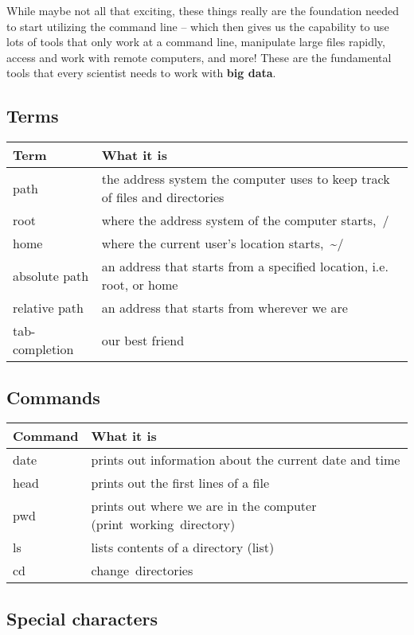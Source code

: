 \documentclass[
]{book}
\begin{document}
While maybe not all that exciting, these things really are the foundation needed to start utilizing the command line -- which then gives us the capability to use lots of tools that only work at a command line, manipulate large files rapidly, access and work with remote computers, and more! These are the fundamental tools that every scientist needs to work with \textbf{big data}.

\hypertarget{terms}{%
\subsection{Terms}\label{terms}}

\begin{longtable}{ll}
\toprule
\textbf{Term} & \textbf{What it is}\\
\midrule
path & the address system the computer uses to keep track of files and directories\\
root & where the address system of the computer starts, /\\
home & where the current user’s location starts, \textasciitilde{}/\\
absolute path & an address that starts from a specified location, i.e. root, or home\\
relative path & an address that starts from wherever we are\\
\addlinespace
tab-completion & our best friend\\
\bottomrule
\end{longtable}

\hypertarget{commands}{%
\subsection{Commands}\label{commands}}

\begin{longtable}{ll}
\toprule
\textbf{Command} & \textbf{What it is}\\
\midrule
date & prints out information about the current date and time\\
head & prints out the first lines of a file\\
pwd & prints out where we are in the computer (print working directory)\\
ls & lists contents of a directory (list)\\
cd & change directories\\
\bottomrule
\end{longtable}

\hypertarget{special-characters}{%
\subsection{Special characters}\label{special-characters}}
\end{document}
